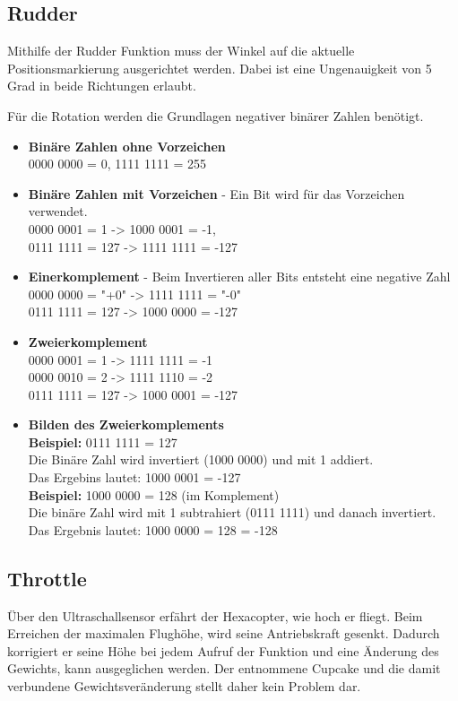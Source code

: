     \subsection*{Rudder}
    Mithilfe der Rudder Funktion muss der Winkel auf die aktuelle Positionsmarkierung ausgerichtet werden. Dabei ist eine Ungenauigkeit von 5 Grad in beide Richtungen erlaubt.

    Für die Rotation werden die Grundlagen negativer binärer Zahlen benötigt.

    \begin{itemize}
    \item \textbf{Binäre Zahlen ohne Vorzeichen}\\
    0000 0000 = 0, 1111 1111 = 255
    \item \textbf{Binäre Zahlen mit Vorzeichen} - Ein Bit wird für das Vorzeichen verwendet. \\
    0000 0001 = 1 -> 1000 0001 = -1, \\
    0111 1111 = 127 -> 1111 1111 = -127
    \item \textbf{Einerkomplement} - Beim Invertieren aller Bits entsteht eine negative Zahl \\
    0000 0000 = "+0" -> 1111 1111 = "-0" \\
    0111 1111 = 127 -> 1000 0000 = -127
    \item \textbf{Zweierkomplement}\\
    0000 0001 = 1 -> 1111 1111 = -1 \\
    0000 0010 = 2 -> 1111 1110 = -2 \\
    0111 1111 = 127 -> 1000 0001 = -127
    \item \textbf{Bilden des Zweierkomplements}\\
    \textbf{Beispiel:} 0111 1111 = 127 \\
    Die Binäre Zahl wird invertiert (1000 0000) und mit 1 addiert. \\
    Das Ergebins lautet: 1000 0001 = -127 \\
    \textbf{Beispiel:} 1000 0000 = 128 (im Komplement) \\
    Die binäre Zahl wird mit 1 subtrahiert (0111 1111) und danach invertiert. \\
    Das Ergebnis lautet: 1000 0000 = 128 = -128 \\
    \end{itemize}


    \subsection*{Throttle}
    Über den Ultraschallsensor erfährt der Hexacopter, wie hoch er fliegt. Beim Erreichen der maximalen Flughöhe, wird seine Antriebskraft gesenkt. Dadurch korrigiert er seine Höhe bei jedem Aufruf der Funktion und eine Änderung des Gewichts, kann ausgeglichen werden. Der entnommene Cupcake und die damit verbundene Gewichtsveränderung stellt daher kein Problem dar.

